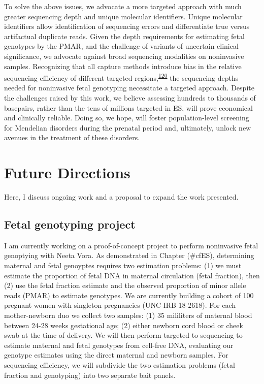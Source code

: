 \documentclass[11pt,letterpaper]{book}
\begin{document}
To solve the above issues, we advocate a more targeted approach with much greater sequencing depth and unique molecular identifiers.
Unique molecular identifiers allow identification of sequencing errors and differentiate true versus artifactual duplicate reads.
Given the depth requirements for estimating fetal genotypes by the PMAR, and the challenge of variants of uncertain clinical significance, we advocate against broad sequencing modalities on noninvasive samples.
Recognizing that all capture methods introduce bias in the relative sequencing efficiency of different targeted regions,\textsuperscript{\protect\hyperlink{ref-seaby:2016aa}{120}} the sequencing depths needed for noninvasive fetal genotyping necessitate a targeted approach.
Despite the challenges raised by this work, we believe assessing hundreds to thousands of basepairs, rather than the tens of millions targeted in ES, will prove economical and clinically reliable.
Doing so, we hope, will foster population-level screening for Mendelian disorders during the prenatal period and, ultimately, unlock new avenues in the treatment of these disorders.

\hypertarget{future-directions}{%
\chapter{Future Directions}\label{future-directions}}

Here, I discuss ongoing work and a proposal to expand the work presented.

\hypertarget{fetal-genotyping-project}{%
\section{Fetal genotyping project}\label{fetal-genotyping-project}}

I am currently working on a proof-of-concept project to perform noninvasive fetal genoptying with Neeta Vora.
As demonstrated in Chapter (\#cfES), determining maternal and fetal genoyptes requires two estimation problems: (1) we must estimate the proportion of fetal DNA in maternal circulation (fetal fraction), then (2) use the fetal fraction estimate and the observed proportion of minor allele reads (PMAR) to estimate genotypes.
We are currently building a cohort of 100 pregnant women with singleton pregnancies (UNC IRB 18-2618).
For each mother-newborn duo we collect two samples: (1) 35 mililiters of maternal blood between 24-28 weeks gestational age; (2) either newborn cord blood or cheek swab at the time of delivery.
We will then perform targeted to sequencing to estimate maternal and fetal genotypes from cell-free DNA, evaluating our genotype estimates using the direct maternal and newborn samples.
For sequencing efficiency, we will subdivide the two estimation problems (fetal fraction and genotyping) into two separate bait panels.
\end{document}
